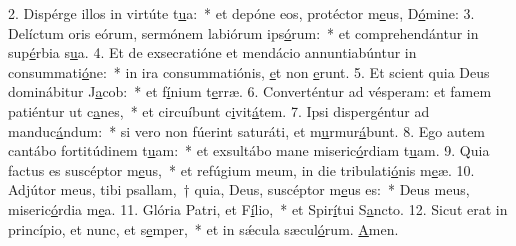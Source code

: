 2. Dispérge illos in virtúte t\uline{u}a:~* et depóne eos, protéctor m\uline{e}us, D\uline{ó}mine:
3. Delíctum oris eórum, sermónem labiórum ips\uline{ó}rum:~* et comprehendántur in sup\uline{é}rbia s\uline{u}a.
4. Et de exsecratióne et mendácio annuntiabúntur in consummati\uline{ó}ne:~* in ira consummatiónis, \uline{e}t non \uline{e}runt.
5. Et scient quia Deus dominábitur J\uline{a}cob:~* et f\uline{í}nium t\uline{e}rræ.
6. Converténtur ad vésperam: et famem patiéntur ut c\uline{a}nes,~* et circuíbunt c\uline{i}vit\uline{á}tem.
7. Ipsi dispergéntur ad manduc\uline{á}ndum:~* si vero non fúerint saturáti, et m\uline{u}rmur\uline{á}bunt.
8. Ego autem cantábo fortitúdinem t\uline{u}am:~* et exsultábo mane miseric\uline{ó}rdiam t\uline{u}am.
9. Quia factus es suscéptor m\uline{e}us,~* et refúgium meum, in die tribulati\uline{ó}nis m\uline{e}æ.
10. Adjútor meus, tibi psallam,~† quia, Deus, suscéptor m\uline{e}us es:~* Deus meus, miseric\uline{ó}rdia m\uline{e}a.
11. Glória Patri, et F\uline{í}lio,~* et Spir\uline{í}tui S\uline{a}ncto.
12. Sicut erat in princípio, et nunc, et s\uline{e}mper,~* et in sǽcula sæcul\uline{ó}rum. \uline{A}men.
